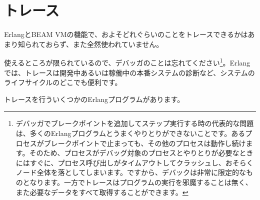 \chapter{トレース}
\label{chap:tracing}

ErlangとBEAM VMの機能で、およそどれぐらいのことをトレースできるかはあまり知られておらず、また全然使われていません。

使えるところが限られているので、デバッガのことは忘れてください\footnote{デバッガでブレークポイントを追加してステップ実行する時の代表的な問題は、多くのErlangプログラムとうまくやりとりができないことです。あるプロセスがブレークポイントで止まっても、その他のプロセスは動作し続けます。そのため、プロセスがデバッグ対象のプロセスとやりとりが必要なときにはすぐに、プロセス呼び出しがタイムアウトしてクラッシュし、おそらくノード全体を落としてしまいます。ですから、デバックは非常に限定的なものとなります。一方でトレースはプログラムの実行を邪魔することは無く、また必要なデータをすべて取得することができます。}。Erlangでは、トレースは開発中あるいは稼働中の本番システムの診断など、システムのライフサイクルのどこでも便利です。

トレースを行ういくつかのErlangプログラムがあります。


